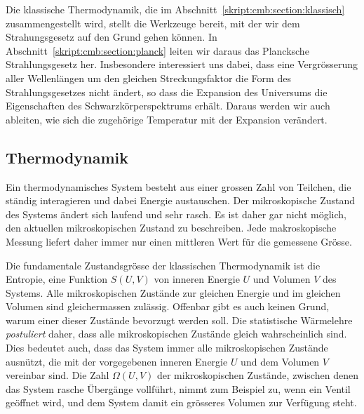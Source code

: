 Die klassische Thermodynamik, die im
Abschnitt~\ref{skript:cmb:section:klassisch} zusammengestellt wird,
stellt die Werkzeuge bereit, mit der wir
dem Strahungsgesetz auf den Grund gehen können.
In Abschnitt~\ref{skript:cmb:section:planck} leiten wir daraus
das Plancksche Strahlungsgesetz her.
Insbesondere interessiert uns dabei, dass eine Vergrösserung aller
Wellenlängen um den gleichen Streckungsfaktor die Form des
Strahlungsgesetzes nicht ändert, so dass die Expansion des Universums
die Eigenschaften des Schwarzkörperspektrums erhält.
Daraus werden wir auch ableiten, wie sich die zugehörige Temperatur
mit der Expansion verändert.


\subsection{Thermodynamik%
\label{skript:cmb:section:klassisch}}
%
Ein thermodynamisches System besteht aus einer grossen Zahl von 
Teilchen, die ständig interagieren und dabei Energie austauschen.
Der mikroskopische Zustand des Systems ändert sich laufend
und sehr rasch.
Es ist daher gar nicht möglich, den aktuellen mikroskopischen
Zustand zu beschreiben.
Jede makroskopische Messung liefert daher immer nur einen mittleren
Wert für die gemessene Grösse.

Die fundamentale Zustandsgrösse der klassischen Thermodynamik ist
die Entropie, eine Funktion $S(U,V)$ von inneren Energie $U$ und 
Volumen $V$ des Systems. 
%
Alle mikroskopischen Zustände zur gleichen Energie und im gleichen
Volumen sind gleichermassen zulässig.
Offenbar gibt es auch keinen Grund, warum einer dieser Zustände
bevorzugt werden soll.
Die statistische Wärmelehre
{\em postuliert} daher, dass alle mikroskopischen Zustände gleich
wahrscheinlich sind.
Dies bedeutet auch, dass das System immer alle mikroskopischen
Zustände ausnützt, die mit der vorgegebenen inneren Energie $U$ und
dem Volumen $V$ vereinbar sind.
Die Zahl $\Omega(U,V)$ der mikroskopischen Zustände, zwischen denen das
System rasche Übergänge vollführt, nimmt zum Beispiel zu, wenn ein
Ventil geöffnet wird, und dem System damit ein grösseres Volumen
zur Verfügung steht.

